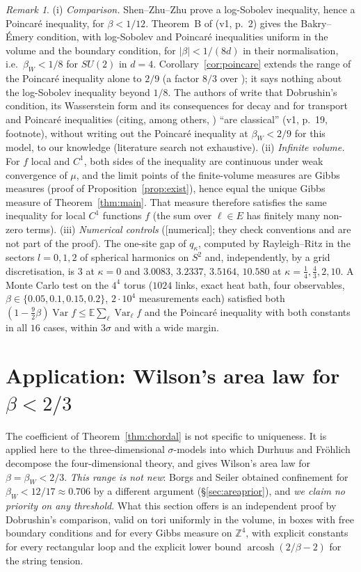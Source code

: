 \documentclass[11pt,a4paper]{article}
\theoremstyle{remark}
\newtheorem{remark}[theorem]{Remark}
\theoremstyle{definition}
\theoremstyle{plain}
\theoremstyle{remark}
\DeclareMathOperator{\arcosh}{arcosh}
\newcommand{\Z}{\mathbb{Z}}
\newcommand{\E}{\mathbb{E}}
\newcommand{\Var}{\operatorname{Var}}
\newcommand{\st}[1]{\textsf{[#1]}}
\begin{document}
\begin{remark}\label{rem:poincare}
(i) \emph{Comparison.} Shen--Zhu--Zhu \cite{SZZ23} prove a log-Sobolev inequality, hence a Poincar\'e inequality, for $\beta<1/12$. Theorem~B of \cite{BB26} (v1, p.~2) gives the Bakry--\'Emery
condition, with log-Sobolev and Poincar\'e inequalities uniform in the volume and the boundary condition, for $|\beta|<1/(8d)$ in their normalisation, i.e.\ $\beta_W<1/8$ for $SU(2)$ in $d=4$. Corollary~\ref{cor:poincare} extends the range of the
Poincar\'e inequality alone to $2/9$ (a factor $8/3$ over \cite{SZZ23}); it says nothing about the log-Sobolev inequality beyond $1/8$. The authors of \cite{BB26} write that Dobrushin's condition,
its Wasserstein form and its consequences for decay and for transport and Poincar\'e inequalities (citing, among others, \cite{Wu06}) ``are classical'' (v1, p.~19, footnote), without writing out the Poincar\'e inequality at $\beta_W<2/9$ for this model, to our
knowledge (literature search not exhaustive).
(ii) \emph{Infinite volume.} For $f$ local and $C^1$, both sides of the inequality are continuous under weak convergence of $\mu$, and the limit points of the finite-volume measures are Gibbs measures (proof of
Proposition~\ref{prop:exist}), hence equal the unique Gibbs measure of Theorem~\ref{thm:main}. That measure therefore satisfies the same inequality for local $C^1$ functions $f$ (the sum over $\ell\in E$ has finitely many non-zero terms).
(iii) \emph{Numerical controls} (\st{numerical}; they check conventions and are not part of the proof). The one-site gap of $q_\kappa$, computed by Rayleigh--Ritz in the sectors $l=0,1,2$ of spherical harmonics on $S^2$ and, independently, by a grid discretisation,
is $3$ at $\kappa=0$ and $3.0083$, $3.2337$, $3.5164$, $10.580$ at $\kappa=\frac14,\frac43,2,10$. A Monte Carlo test on the $4^4$ torus ($1024$ links, exact heat bath, four observables, $\beta\in\{0.05,0.1,0.15,0.2\}$, $2\cdot10^4$ measurements each)
satisfied both $(1-\frac92\beta)\Var f\le\E\sum_\ell\Var_\ell f$ and the Poincar\'e inequality with both constants in all $16$ cases, within $3\sigma$ and with a wide margin.
\end{remark}

\section{Application: Wilson's area law for $\beta<2/3$}\label{sec:area}

The coefficient of Theorem~\ref{thm:chordal} is not specific to uniqueness. It is applied here to the three-dimensional $\sigma$-models into which Durhuus and Fr\"ohlich \cite{DF80} decompose the four-dimensional theory, and gives Wilson's area law for $\beta=\beta_W<2/3$. \emph{This range is not new}: Borgs and Seiler \cite{BS83} obtained confinement for $\beta_W<12/17\approx0.706$ by a different argument (\S\ref{sec:areaprior}), and \emph{we claim no priority on any threshold}. What this section offers is an independent proof by Dobrushin's comparison, valid on tori uniformly in the volume, in boxes with free boundary conditions and for every Gibbs measure on $\Z^4$, with explicit constants for every rectangular loop and the explicit lower bound $\arcosh(2/\beta-2)$ for the string tension.
\end{document}

